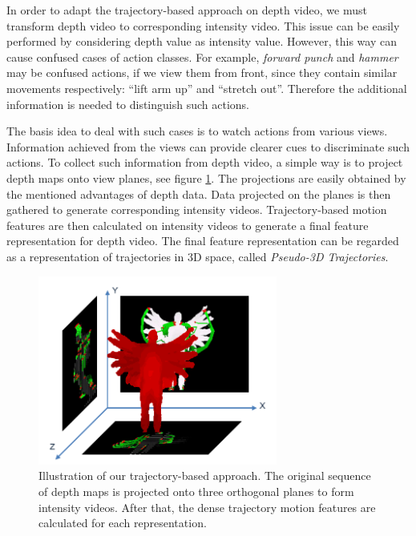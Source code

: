 \documentclass[review]{elsarticle}
\begin{document}
In order to adapt the trajectory-based approach on depth video, we must transform depth video to corresponding intensity video. This issue can be easily performed by considering depth value as intensity value. However, this way can cause confused cases of action classes. For example, \textit{forward punch} and \textit{hammer} may be confused actions, if we view them from front, since they contain similar movements respectively: ``lift arm up'' and ``stretch out''. Therefore the additional information is needed to distinguish such actions.

The basis idea to deal with such cases is to watch actions from various views. Information achieved from the views can provide clearer cues to discriminate such actions. To collect such information from depth video, a simple way is to project depth maps onto view planes, see figure \ref{lbl:Figure_ProposedMethod}. The projections are easily obtained by the mentioned advantages of depth data. Data projected on the planes is then gathered to generate corresponding intensity videos. Trajectory-based motion features are then calculated on intensity videos to generate a final feature representation for depth video. The final feature representation can be regarded as a representation of trajectories in 3D space, called \textit{Pseudo-3D Trajectories}.

\begin{figure}
	\begin{center}
		\includegraphics[width=0.7\textwidth]{Projections.png}
	\end{center}
	\caption{\label{lbl:Figure_ProposedMethod}Illustration of our trajectory-based approach. The original sequence of depth maps is projected onto three orthogonal planes to form intensity videos. After that, the dense trajectory motion features are calculated for each representation.}
\end{figure}
\end{document}
